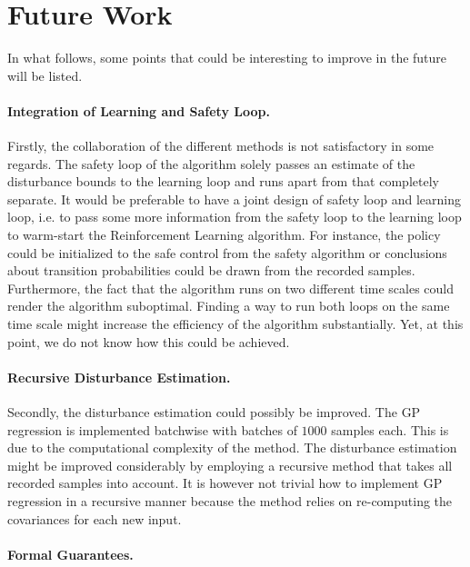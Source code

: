 \documentclass[../main.tex]{subfiles}
\begin{document}
\section{Future Work}

In what follows, some points that could be interesting to improve in the future will be listed. \par

\paragraph{Integration of Learning and Safety Loop.} Firstly, the collaboration of the different methods is not satisfactory in some regards. The safety loop of the algorithm solely passes an estimate of the disturbance bounds to the learning loop and runs apart from that completely separate. It would be preferable to have a joint design of safety loop and learning loop, i.e. to pass some more information from the safety loop to the learning loop to warm-start the Reinforcement Learning algorithm. For instance, the policy could be initialized to the safe control from the safety algorithm or conclusions about transition probabilities could be drawn from the recorded samples. Furthermore, the fact that the algorithm runs on two different time scales could render the algorithm suboptimal. Finding a way to run both loops on the same time scale might increase the efficiency of the algorithm substantially. Yet, at this point, we do not know how this could be achieved.\par
\paragraph{Recursive Disturbance Estimation.} Secondly, the disturbance estimation could possibly be improved. The GP regression is implemented batchwise with batches of $1000$ samples each. This is due to the computational complexity of the method. The disturbance estimation might be improved considerably by employing a recursive method that takes all recorded samples into account. It is however not trivial how to implement GP regression in a recursive manner because the method relies on re-computing the covariances for each new input.\par
\paragraph{Formal Guarantees.} 
\end{document}
